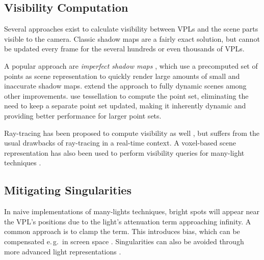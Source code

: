 \subsection{Visibility Computation}
\label{sec:intro:relatedWorkManyLight:visibility}

Several approaches exist to calculate visibility between VPLs and the scene parts visible to the camera. Classic shadow maps are a fairly exact solution, but cannot be updated every frame for the several hundreds or even thousands of VPLs.

A popular approach are \emph{imperfect shadow maps} \citep[ISMs,][]{ritschel2008ism}, which use a precomputed set of points as scene representation to quickly render large amounts of small and inaccurate shadow maps. \citet{ritschel2011ismsViewAdaptive} extend the approach to fully dynamic scenes among other improvements. \citet{barak2013temporally} use tessellation to compute the point set, eliminating the need to keep a separate point set updated, making it inherently dynamic and providing better performance for larger point sets.

Ray-tracing has been proposed to compute visibility as well \citep[e.\,g.][]{segovia2006bidirectional}, but suffers from the usual drawbacks of ray-tracing in a real-time context. A voxel-based scene representation has also been used to perform visibility queries for many-light techniques \citep{sun2015manylightsSVO}.


\subsection{Mitigating Singularities}
\label{sec:intro:relatedWorkManyLight:singularities}

In naive implementations of many-lights techniques, bright spots will appear near the VPL’s positions due to the light’s attenuation term approaching infinity. A common approach is to clamp the term. This introduces bias, which can be compensated e.\,g.\ in screen space \citep{novak2011screen}. Singularities can also be avoided through more advanced light representations \citep{tokuyoshi2015vsgl}.


\cleardoublepage
